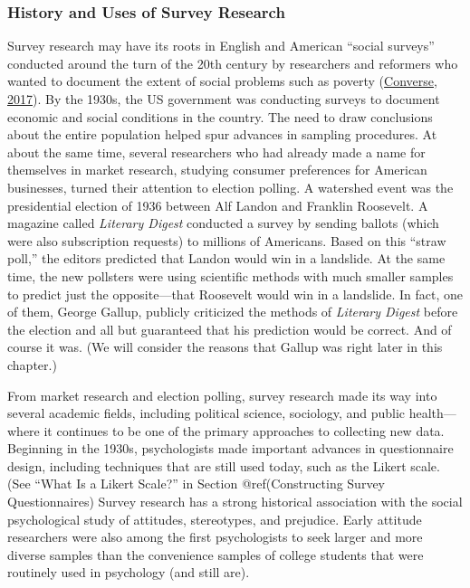 \documentclass[
]{krantz}
\begin{document}
\hypertarget{history-and-uses-of-survey-research}{%
\subsubsection*{History and Uses of Survey Research}\label{history-and-uses-of-survey-research}}


Survey research may have its roots in English and American ``social surveys'' conducted around the turn of the 20th century by researchers and reformers who wanted to document the extent of social problems such as poverty (\protect\hyperlink{ref-converse2017survey}{Converse, 2017}). By the 1930s, the US government was conducting surveys to document economic and social conditions in the country. The need to draw conclusions about the entire population helped spur advances in sampling procedures. At about the same time, several researchers who had already made a name for themselves in market research, studying consumer preferences for American businesses, turned their attention to election polling. A watershed event was the presidential election of 1936 between Alf Landon and Franklin Roosevelt. A magazine called \emph{Literary Digest} conducted a survey by sending ballots (which were also subscription requests) to millions of Americans. Based on this ``straw poll,'' the editors predicted that Landon would win in a landslide. At the same time, the new pollsters were using scientific methods with much smaller samples to predict just the opposite---that Roosevelt would win in a landslide. In fact, one of them, George Gallup, publicly criticized the methods of \emph{Literary Digest} before the election and all but guaranteed that his prediction would be correct. And of course it was. (We will consider the reasons that Gallup was right later in this chapter.)

From market research and election polling, survey research made its way into several academic fields, including political science, sociology, and public health---where it continues to be one of the primary approaches to collecting new data. Beginning in the 1930s, psychologists made important advances in questionnaire design, including techniques that are still used today, such as the Likert scale. (See ``What Is a Likert Scale?'' in Section @ref(Constructing Survey Questionnaires) Survey research has a strong historical association with the social psychological study of attitudes, stereotypes, and prejudice. Early attitude researchers were also among the first psychologists to seek larger and more diverse samples than the convenience samples of college students that were routinely used in psychology (and still are).
\end{document}
